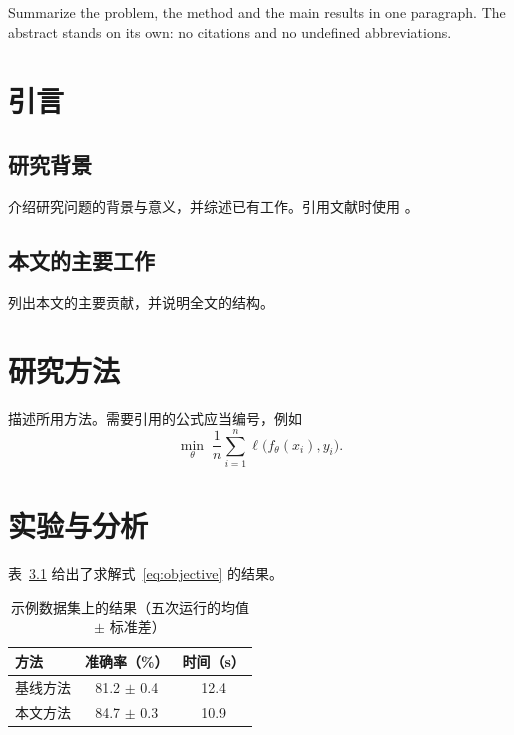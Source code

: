 \documentclass[type=doctor]{fduthesis}
\begin{document}
\frontmatter
\tableofcontents

\begin{abstract}
  用一段话概述研究的问题、方法与主要结论。摘要应当独立成篇，
不使用引用和未定义的缩写。
\end{abstract}

\begin{abstract*}
  Summarize the problem, the method and the main results in one
paragraph. The abstract stands on its own: no citations and no undefined
abbreviations.
\end{abstract*}

\mainmatter

\chapter{引言}
\label{chap:intro}

\section{研究背景}
介绍研究问题的背景与意义，并综述已有工作。引用文献时使用
\cite{knuth1984texbook,lamport1994latex}。

\section{本文的主要工作}
列出本文的主要贡献，并说明全文的结构。

\chapter{研究方法}
\label{chap:method}

描述所用方法。需要引用的公式应当编号，例如
\begin{equation}
  \label{eq:objective}
  \min_{\theta} \; \frac{1}{n} \sum_{i=1}^{n} \ell\bigl(f_\theta(x_i), y_i\bigr) .
\end{equation}

\chapter{实验与分析}
\label{chap:experiments}

表~\ref{tab:results} 给出了求解式~\eqref{eq:objective} 的结果。

\begin{table}[!htb]
  \centering
  \caption{示例数据集上的结果（五次运行的均值 $\pm$ 标准差）}
  \label{tab:results}
  \begin{tabular}{lcc}
    \toprule
    方法     & 准确率（\%）     & 时间（s） \\
    \midrule
    基线方法 & 81.2 $\pm$ 0.4 & 12.4      \\
    本文方法 & 84.7 $\pm$ 0.3 & 10.9      \\
    \bottomrule
  \end{tabular}
\end{table}
\end{document}
